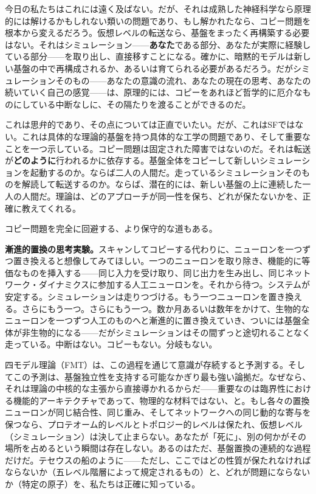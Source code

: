 \documentclass[11pt, twoside, openright]{book}
\begin{document}
今日の私たちはこれには遠く及ばない。だが、それは成熟した神経科学なら原理的には解けるかもしれない類いの問題であり、もし解かれたなら、コピー問題を根本から変えるだろう。仮想レベルの転送なら、基盤をまったく再構築する必要はない。それはシミュレーション------\textbf{あなた}である部分、あなたが実際に経験している部分------を取り出し、直接移すことになる。確かに、暗黙的モデルは新しい基盤の中で再構成されるか、あるいは育てられる必要があるだろう。だがシミュレーションそのもの------あなたの意識の流れ、あなたの現在の思考、あなたの続いていく自己の感覚------は、原理的には、コピーをあれほど哲学的に厄介なものにしている中断なしに、その隔たりを渡ることができるのだ。

これは思弁的であり、その点については正直でいたい。だが、これはSFではない。これは具体的な理論的基盤を持つ具体的な工学の問題であり、そして重要なことを一つ示している。コピー問題は固定された障害ではないのだ。それは転送が\textbf{どのように}行われるかに依存する。基盤全体をコピーして新しいシミュレーションを起動するのか。ならば二人の人間だ。走っているシミュレーションそのものを解読して転送するのか。ならば、潜在的には、新しい基盤の上に連続した一人の人間だ。理論は、どのアプローチが同一性を保ち、どれが保たないかを、正確に教えてくれる。

コピー問題を完全に回避する、より保守的な道もある。

\textbf{漸進的置換の思考実験。}スキャンしてコピーする代わりに、ニューロンを一つずつ置き換えると想像してみてほしい。一つのニューロンを取り除き、機能的に等価なものを挿入する------同じ入力を受け取り、同じ出力を生み出し、同じネットワーク・ダイナミクスに参加する人工ニューロンを。それから待つ。システムが安定する。シミュレーションは走りつづける。もう一つニューロンを置き換える。さらにもう一つ。さらにもう一つ。数か月あるいは数年をかけて、生物的なニューロンを一つずつ人工のものへと漸進的に置き換えていき、ついには基盤全体が非生物的になる------だがシミュレーションはその間ずっと途切れることなく走っている。中断はない。コピーもない。分岐もない。

四モデル理論（FMT）は、この過程を通じて意識が存続すると予測する。そしてこの予測は、基盤独立性を支持する可能なかぎり最も強い論拠だ。なぜなら、それは理論の中核的な主張から直接導かれるからだ------重要なのは臨界性における機能的アーキテクチャであって、物理的な材料ではない、と。もし各々の置換ニューロンが同じ結合性、同じ重み、そしてネットワークへの同じ動的な寄与を保つなら、プロテオーム的レベルとトポロジー的レベルは保たれ、仮想レベル（シミュレーション）は決して止まらない。あなたが「死に」、別の何かがその場所を占めるという瞬間は存在しない。あるのはただ、基盤置換の連続的な過程だけだ。テセウスの船のように------ただし、ここではどの性質が保たれなければならないか（五レベル階層によって規定されるもの）と、どれが問題にならないか（特定の原子）を、私たちは正確に知っている。
\end{document}
